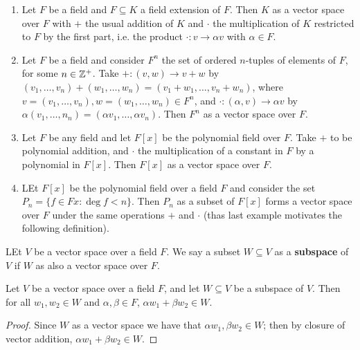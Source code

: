 \begin{example}
    \begin{enumerate}[label=(\arabic*)]
        \item Let $F$ be a field and  $F \subseteq K$ a field extension of  $F$.
            Then  $K$ as a vector space over  $F$ with  $+$ the usual addition
            of  $K$ and  $\cdot$ the multiplication of  $K$ restricted to  $F$
            by the first part, i.e. the product  $\cdot:v \rightarrow \alpha v$
            with $\alpha \in F$.

        \item Let  $F$ be a field and consider  $F^n$ the set of ordered
            $n$-tuples of elements of $F$, for some  $n \in \mathbb{Z}^+$. Take $+:(v,w)
            \rightarrow v+w$ by $(v_1, \dots, v_n)+(w_1, \dots, w_n)=(v_1+w_1,
            \dots, v_n+w_n)$, where $v=(v_1, \dots, v_n), w=(w_1, \dots, w_n)
            \in F^n$, and $\cdot:(\alpha,v) \rightarrow \alpha v$ by
            $\alpha(v_1, \dots, n_n)=(\alpha v_1, \dots, \alpha v_n)$. Then
            $F^n$ as a vector space over  $F$.

        \item Let  $F$ be any field and let  $F[x]$ be the polynomial field over
            $F$. Take  $+$ to be polynomial addition, and  $\cdot$ the
            multiplication of a constant in $F$ by a polynomial in $F[x]$. Then
            $F[x]$ as a vector space over $F$.

        \item LEt  $F[x]$ be the polynomial field over a field $F$ and consider
            the set  $P_n=\{f \in F{x}: \deg{f}<n\}$. Then $P_n$ as a subset of
             $F[x]$ forms a vector space over $F$ under the same operations  $+$
             and  $\cdot$ (thas last example motivates the following
             definition).
    \end{enumerate}
\end{example}

\begin{definition}
    LEt $V$ be a vector space over a field  $F$. We say a subset  $W \subseteq
    V$ as a \textbf{subspace} of $V$ if  $W$ as also a vector space over $F$.
\end{definition}

\begin{lemma}\label{1.1.2}
    Let $V$ be a vector space over a field  $F$, and let  $W \subseteq V$ be a
    subspace of  $V$. Then for all  $ w_1,w_2 \in W$ and $\alpha,\beta \in F$,
    $\alpha w_1+\beta w_2 \in W$.
\end{lemma}
\begin{proof}
    Since $W$ as a vector space  we have that $ \alpha w_1,\beta w_2 \in W$;
    then by closure of vector addition, $\alpha w_1+\beta w_2 \in W$.
\end{proof}

